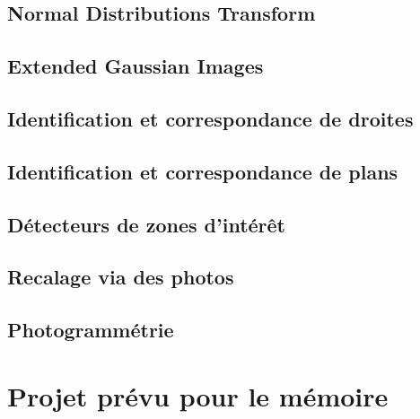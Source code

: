 \documentclass[a4paper,10pt]{scrreprt}
\begin{document}
\section{Normal Distributions Transform}

\section{Extended Gaussian Images}

\section{Identification et correspondance de droites}

\section{Identification et correspondance de plans}

\section{Détecteurs de zones d'intérêt}

\section{Recalage via des photos}

\section{Photogrammétrie}

\chapter{Projet prévu pour le mémoire}



\end{document}

